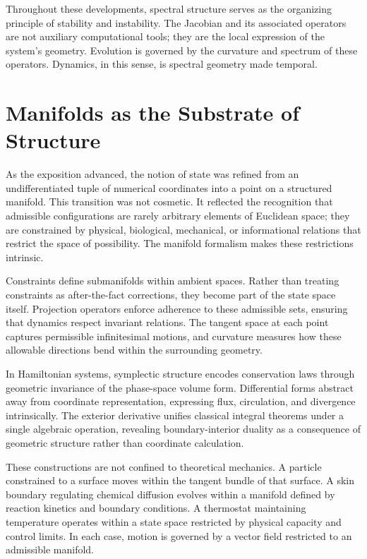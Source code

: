 \documentclass[12pt]{book}
\begin{document}
Throughout these developments, spectral structure serves as the
organizing principle of stability and instability. The Jacobian and
its associated operators are not auxiliary computational tools; they
are the local expression of the system’s geometry. Evolution is
governed by the curvature and spectrum of these operators. Dynamics,
in this sense, is spectral geometry made temporal.

\section{Manifolds as the Substrate of Structure}

As the exposition advanced, the notion of state was refined from an
undifferentiated tuple of numerical coordinates into a point on a
structured manifold. This transition was not cosmetic. It reflected
the recognition that admissible configurations are rarely arbitrary
elements of Euclidean space; they are constrained by physical,
biological, mechanical, or informational relations that restrict the
space of possibility. The manifold formalism makes these restrictions
intrinsic.

Constraints define submanifolds within ambient spaces. Rather than
treating constraints as after-the-fact corrections, they become part
of the state space itself. Projection operators enforce adherence to
these admissible sets, ensuring that dynamics respect invariant
relations. The tangent space at each point captures permissible
infinitesimal motions, and curvature measures how these allowable
directions bend within the surrounding geometry.

In Hamiltonian systems, symplectic structure encodes conservation
laws through geometric invariance of the phase-space volume form.
Differential forms abstract away from coordinate representation,
expressing flux, circulation, and divergence intrinsically.
The exterior derivative unifies classical integral theorems under a
single algebraic operation, revealing boundary-interior duality as a
consequence of geometric structure rather than coordinate calculation.

These constructions are not confined to theoretical mechanics.
A particle constrained to a surface moves within the tangent bundle of
that surface. A skin boundary regulating chemical diffusion evolves
within a manifold defined by reaction kinetics and boundary
conditions. A thermostat maintaining temperature operates within a
state space restricted by physical capacity and control limits.
In each case, motion is governed by a vector field restricted to an
admissible manifold.
\end{document}
